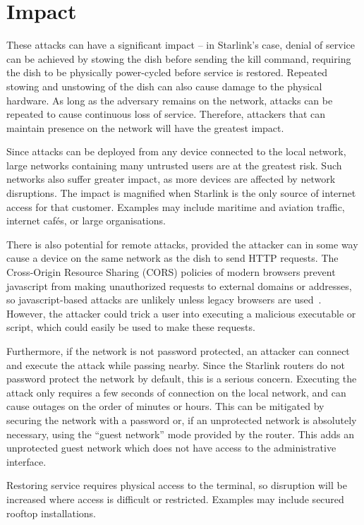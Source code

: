 \section{Impact}\label{sec:impact}

These attacks can have a significant impact -- in Starlink's case, denial of service can be achieved by stowing the dish before sending the kill command, requiring the dish to be physically power-cycled before service is restored.
Repeated stowing and unstowing of the dish can also cause damage to the physical hardware.
As long as the adversary remains on the network, attacks can be repeated to cause continuous loss of service.
Therefore, attackers that can maintain presence on the network will have the greatest impact.

Since attacks can be deployed from any device connected to the local network, large networks containing many untrusted users are at the greatest risk.
Such networks also suffer greater impact, as more devices are affected by network disruptions.
The impact is magnified when Starlink is the only source of internet access for that customer.
Examples may include maritime and aviation traffic, internet cafés, or large organisations.

There is also potential for remote attacks, provided the attacker can in some way cause a device on the same network as the dish to send HTTP requests.
The Cross-Origin Resource Sharing (CORS) policies of modern browsers prevent javascript from making unauthorized requests to external domains or addresses, so javascript-based attacks are unlikely unless legacy browsers are used~\cite{cors}.
However, the attacker could trick a user into executing a malicious executable or script, which could easily be used to make these requests.

Furthermore, if the network is not password protected, an attacker can connect and execute the attack while passing nearby.
Since the Starlink routers do not password protect the network by default, this is a serious concern.
Executing the attack only requires a few seconds of connection on the local network, and can cause outages on the order of minutes or hours.
This can be mitigated by securing the network with a password or, if an unprotected network is absolutely necessary, using the ``guest network'' mode provided by the router.
This adds an unprotected guest network which does not have access to the administrative interface.

Restoring service requires physical access to the terminal, so disruption will be increased where access is difficult or restricted.
Examples may include secured rooftop installations.



